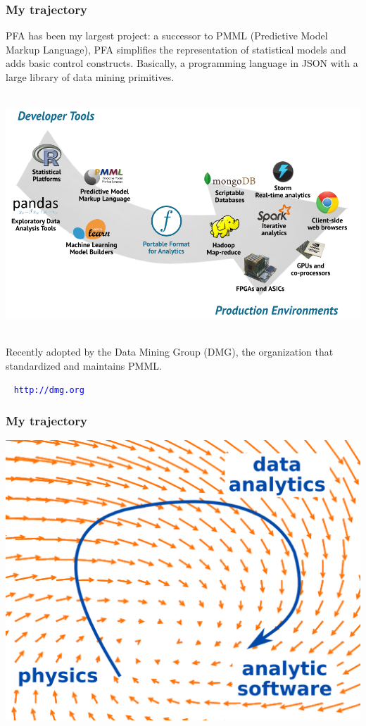 \documentclass[compress]{beamer}
\begin{document}
\begin{frame}
\frametitle{My trajectory}

PFA has been my largest project: a successor to PMML (Predictive Model Markup Language), PFA simplifies the representation of statistical models and adds basic control constructs. Basically, a programming language in JSON with a large library of data mining primitives.

\vspace{0.2 cm}
\mbox{ } \hfill \includegraphics[width=0.7\linewidth]{PLOTS/pfatoeverything.png} \hfill \mbox{ }

\vspace{0.2 cm}
Recently adopted by the Data Mining Group (DMG), the organization that standardized and maintains PMML.

\vspace{0.2 cm}
\mbox{ } \hfill {\tt \textcolor{blue}{http://dmg.org}} \hfill \mbox{ }

\end{frame}

\begin{frame}
\frametitle{My trajectory}
\begin{center}
\includegraphics[width=0.8\linewidth]{PLOTS/vectorfield2_annotated.png}
\end{center}
\end{frame}
\end{document}
